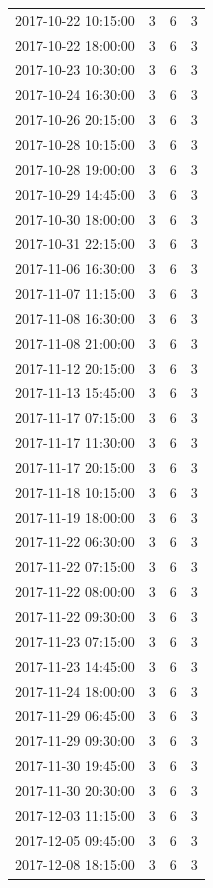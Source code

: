 \begin{tabular}{lrrr}
2017-10-22 10:15:00 & 3 & 6 & 3 \\
2017-10-22 18:00:00 & 3 & 6 & 3 \\
2017-10-23 10:30:00 & 3 & 6 & 3 \\
2017-10-24 16:30:00 & 3 & 6 & 3 \\
2017-10-26 20:15:00 & 3 & 6 & 3 \\
2017-10-28 10:15:00 & 3 & 6 & 3 \\
2017-10-28 19:00:00 & 3 & 6 & 3 \\
2017-10-29 14:45:00 & 3 & 6 & 3 \\
2017-10-30 18:00:00 & 3 & 6 & 3 \\
2017-10-31 22:15:00 & 3 & 6 & 3 \\
2017-11-06 16:30:00 & 3 & 6 & 3 \\
2017-11-07 11:15:00 & 3 & 6 & 3 \\
2017-11-08 16:30:00 & 3 & 6 & 3 \\
2017-11-08 21:00:00 & 3 & 6 & 3 \\
2017-11-12 20:15:00 & 3 & 6 & 3 \\
2017-11-13 15:45:00 & 3 & 6 & 3 \\
2017-11-17 07:15:00 & 3 & 6 & 3 \\
2017-11-17 11:30:00 & 3 & 6 & 3 \\
2017-11-17 20:15:00 & 3 & 6 & 3 \\
2017-11-18 10:15:00 & 3 & 6 & 3 \\
2017-11-19 18:00:00 & 3 & 6 & 3 \\
2017-11-22 06:30:00 & 3 & 6 & 3 \\
2017-11-22 07:15:00 & 3 & 6 & 3 \\
2017-11-22 08:00:00 & 3 & 6 & 3 \\
2017-11-22 09:30:00 & 3 & 6 & 3 \\
2017-11-23 07:15:00 & 3 & 6 & 3 \\
2017-11-23 14:45:00 & 3 & 6 & 3 \\
2017-11-24 18:00:00 & 3 & 6 & 3 \\
2017-11-29 06:45:00 & 3 & 6 & 3 \\
2017-11-29 09:30:00 & 3 & 6 & 3 \\
2017-11-30 19:45:00 & 3 & 6 & 3 \\
2017-11-30 20:30:00 & 3 & 6 & 3 \\
2017-12-03 11:15:00 & 3 & 6 & 3 \\
2017-12-05 09:45:00 & 3 & 6 & 3 \\
2017-12-08 18:15:00 & 3 & 6 & 3 \\

\end{tabular}
